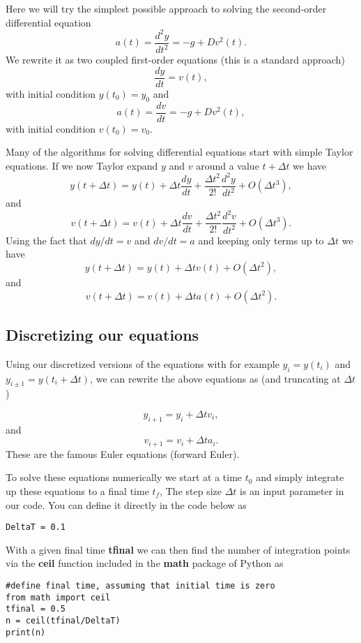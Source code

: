 \documentclass[%
oneside,                 %
final,                   %
10pt]{article}
\begin{document}
Here we will try the simplest possible approach to solving the second-order differential 
equation
\[
a(t) =\frac{d^2y}{dt^2}= -g +Dv^2(t). 
\]
We rewrite it as two coupled first-order equations (this is a standard approach)
\[
\frac{dy}{dt} = v(t),
\]
with initial condition $y(t_0)=y_0$ and 
\[
a(t) =\frac{dv}{dt}= -g +Dv^2(t),
\]
with initial condition $v(t_0)=v_0$.

Many of the algorithms for solving differential equations start with simple Taylor equations.
If we now Taylor expand $y$ and $v$ around a value $t+\Delta t$ we have
\[
y(t+\Delta t) = y(t)+\Delta t \frac{dy}{dt}+\frac{\Delta t^2}{2!} \frac{d^2y}{dt^2}+O(\Delta t^3),
\]
and
\[
v(t+\Delta t) = v(t)+\Delta t \frac{dv}{dt}+\frac{\Delta t^2}{2!} \frac{d^2v}{dt^2}+O(\Delta t^3).
\]
Using the fact that $dy/dt = v$ and $dv/dt=a$ and keeping only terms up to $\Delta t$ we have
\[
y(t+\Delta t) = y(t)+\Delta t v(t)+O(\Delta t^2),
\]
and
\[
v(t+\Delta t) = v(t)+\Delta t a(t)+O(\Delta t^2).
\]

\subsection*{Discretizing our equations}

Using our discretized versions of the equations with for example
$y_{i}=y(t_i)$ and $y_{i\pm 1}=y(t_i+\Delta t)$, we can rewrite the
above equations as (and truncating at $\Delta t$)

\[
y_{i+1} = y_i+\Delta t v_i,
\]
and
\[
v_{i+1} = v_i+\Delta t a_i.
\]
These are the famous Euler equations (forward Euler).

To solve these equations numerically we start at a time $t_0$ and simply integrate up these equations to a final time $t_f$,
The step size $\Delta t$ is an input  parameter in our code.
You can define it directly in the code below as


\begin{verbatim}
DeltaT = 0.1

\end{verbatim}

With a given final time \textbf{tfinal}  we can then find the number of integration points via the \textbf{ceil} function included in the \textbf{math} package of Python
as






\begin{verbatim}
#define final time, assuming that initial time is zero
from math import ceil
tfinal = 0.5
n = ceil(tfinal/DeltaT)
print(n)

\end{verbatim}
\end{document}
